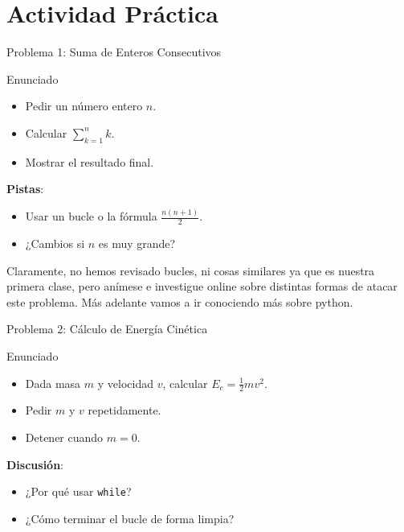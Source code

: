 \documentclass[10pt]{beamer}
\begin{document}
\section{Actividad Práctica}

\begin{frame}{Problema 1: Suma de Enteros Consecutivos}
\begin{block}{Enunciado}
  \begin{itemize}
    \item Pedir un número entero \(n\).
    \item Calcular \(\sum_{k=1}^{n} k\).
    \item Mostrar el resultado final.
  \end{itemize}
\end{block}
\textbf{Pistas}:
\begin{itemize}
  \item Usar un bucle o la fórmula \(\frac{n(n+1)}{2}\).
  \item ¿Cambios si \(n\) es muy grande?
\end{itemize}

Claramente, no hemos revisado bucles, ni cosas similares ya que es nuestra primera clase, pero anímese e investigue online sobre distintas formas de atacar este problema. Más adelante vamos a ir conociendo más sobre python.

\end{frame}

\begin{frame}{Problema 2: Cálculo de Energía Cinética}
\begin{block}{Enunciado}
  \begin{itemize}
    \item Dada masa \(m\) y velocidad \(v\), calcular \(E_c = \frac{1}{2}mv^2\).
    \item Pedir \(m\) y \(v\) repetidamente.
    \item Detener cuando \(m=0\).
  \end{itemize}
\end{block}
\textbf{Discusión}:
\begin{itemize}
  \item ¿Por qué usar \texttt{while}?
  \item ¿Cómo terminar el bucle de forma limpia?
\end{itemize}
\end{frame}
\end{document}
